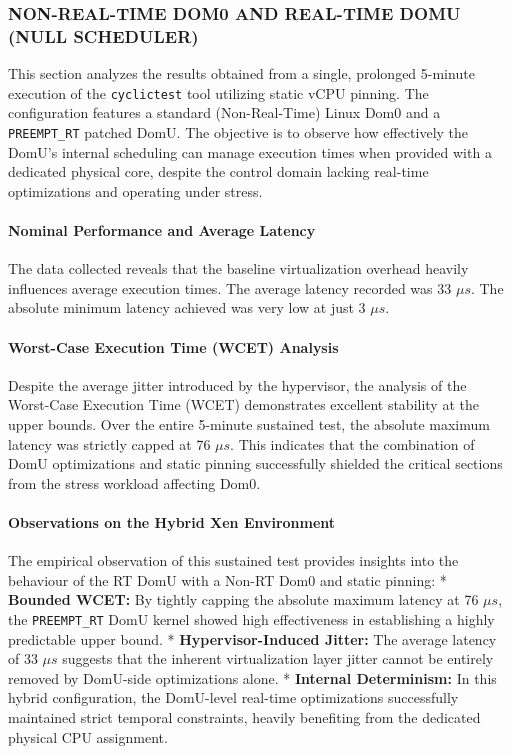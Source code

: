 \subsubsection{NON-REAL-TIME DOM0 AND REAL-TIME DOMU (NULL
SCHEDULER)}\label{non-real-time-dom0-and-real-time-domu-null-scheduler-1}

This section analyzes the results obtained from a single, prolonged
5-minute execution of the \texttt{cyclictest} tool utilizing static vCPU
pinning. The configuration features a standard (Non-Real-Time) Linux
Dom0 and a \texttt{PREEMPT\_RT} patched DomU. The objective is to
observe how effectively the DomU's internal scheduling can manage
execution times when provided with a dedicated physical core, despite
the control domain lacking real-time optimizations and operating under
stress.

\paragraph{Nominal Performance and Average
Latency}\label{nominal-performance-and-average-latency-20}

The data collected reveals that the baseline virtualization overhead
heavily influences average execution times. The average latency recorded
was 33 $\mu s$. The absolute minimum latency achieved was very low at just 3
$\mu s$.

\paragraph{Worst-Case Execution Time (WCET)
Analysis}\label{worst-case-execution-time-wcet-analysis-22}

Despite the average jitter introduced by the hypervisor, the analysis of
the Worst-Case Execution Time (WCET) demonstrates excellent stability at
the upper bounds. Over the entire 5-minute sustained test, the absolute
maximum latency was strictly capped at 76 $\mu s$. This indicates that the
combination of DomU optimizations and static pinning successfully
shielded the critical sections from the stress workload affecting Dom0.

\paragraph{Observations on the Hybrid Xen
Environment}\label{observations-on-the-hybrid-xen-environment-3}

The empirical observation of this sustained test provides insights into
the behaviour of the RT DomU with a Non-RT Dom0 and static pinning: *
\textbf{Bounded WCET:} By tightly capping the absolute maximum latency
at 76 $\mu s$, the \texttt{PREEMPT\_RT} DomU kernel showed high effectiveness
in establishing a highly predictable upper bound. *
\textbf{Hypervisor-Induced Jitter:} The average latency of 33 $\mu s$
suggests that the inherent virtualization layer jitter cannot be
entirely removed by DomU-side optimizations alone. * \textbf{Internal
Determinism:} In this hybrid configuration, the DomU-level real-time
optimizations successfully maintained strict temporal constraints,
heavily benefiting from the dedicated physical CPU assignment.

